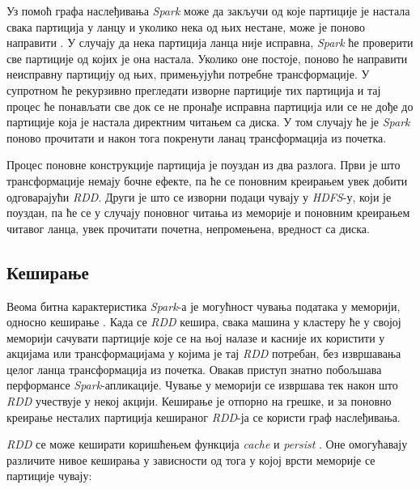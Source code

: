\documentclass[12pt,oneside]{memoir}
\begin{document}
Уз помоћ графа наслеђивања \textit{Spark} може да закључи од које партиције је настала свака партиција у ланцу и уколико нека од њих нестане, може је поново направити \cite{hadoop_learning}. У случају да нека партиција ланца није исправна, \textit{Spark} ће проверити све партиције од којих је она настала. Уколико оне постоје, поново ће направити неисправну партицију од њих, примењујући потребне трансформације. У супротном ће рекурзивно прегледати изворне партиције тих партиција и тај процес ће понављати све док се не пронађе исправна партиција или се не дође до партиције која је настала директним читањем са диска. У том случају ће је \textit{Spark} поново прочитати и након тога покренути ланац трансформација из почетка.

Процес поновне конструкције партиција је поуздан из два разлога. Први је што трансформације немају бочне ефекте, па ће се поновним креирањем увек добити одговарајући \textit{RDD}. Други је што се изворни подаци чувају у \textit{HDFS}-у, који је поуздан, па ће се у случају поновног читања из меморије и поновним креирањем читавог ланца, увек прочитати почетна, непромењена, вредност са диска.

\subsection{Кеширање}
\label{subsec:spark_persist}

Веома битна карактеристика \textit{Spark}-а је могућност чувања података у меморији, односно кеширање \cite{spark_rdd}. Када се \textit{RDD} кешира, свака машина у кластеру ће у својој меморији сачувати партиције које се на њој налазе и касније их користити у акцијама или трансформацијама у којима је тај \textit{RDD} потребан, без извршавања целог ланца трансформација из почетка. Овакав приступ знатно побољшава перформансе \textit{Spark}-апликације. Чување у меморији се извршава тек након што \textit{RDD} учествује у некој акцији. Кеширање је отпорно на грешке, и за поновно креирање несталих партиција кешираног \textit{RDD}-ја се користи граф наслеђивања.

\textit{RDD} се може кеширати коришћењем функција \textit{cache} и \textit{persist} \cite{spark_rdd}. Оне омогућавају различите нивое кеширања у зависности од тога у којој врсти меморије се партиције чувају:
\end{document}
